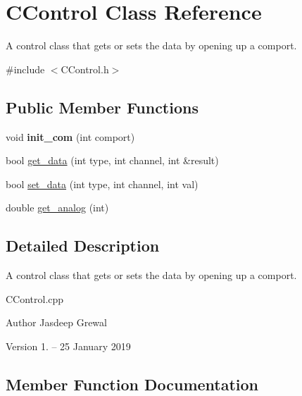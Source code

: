 \hypertarget{class_c_control}{}\section{C\+Control Class Reference}
\label{class_c_control}


A control class that gets or sets the data by opening up a comport.  




{\ttfamily \#include $<$C\+Control.\+h$>$}

\subsection*{Public Member Functions}
\begin{DoxyCompactItemize}
\item 
\hypertarget{class_c_control_a3d1384d0e1ee2a4a478a798b46457468}{}\label{class_c_control_a3d1384d0e1ee2a4a478a798b46457468} 
void {\bfseries init\+\_\+com} (int comport)
\item 
bool \hyperlink{class_c_control_a0bad8e51e54cb6f1e2a7b51d3a3940d3}{get\+\_\+data} (int type, int channel, int \&result)
\item 
bool \hyperlink{class_c_control_a13f557815616ef66a8f5dd4b725d8c32}{set\+\_\+data} (int type, int channel, int val)
\item 
double \hyperlink{class_c_control_a0321002fa4b31b1e3da23a5f2f21ecc3}{get\+\_\+analog} (int)
\end{DoxyCompactItemize}


\subsection{Detailed Description}
A control class that gets or sets the data by opening up a comport. 

C\+Control.\+cpp

\begin{DoxyAuthor}{Author}
Jasdeep Grewal
\end{DoxyAuthor}
\begin{DoxyVersion}{Version}
1. -- 25 January 2019 
\end{DoxyVersion}


\subsection{Member Function Documentation}
\hypertarget{class_c_control_a0321002fa4b31b1e3da23a5f2f21ecc3}{}\label{class_c_control_a0321002fa4b31b1e3da23a5f2f21ecc3} 
